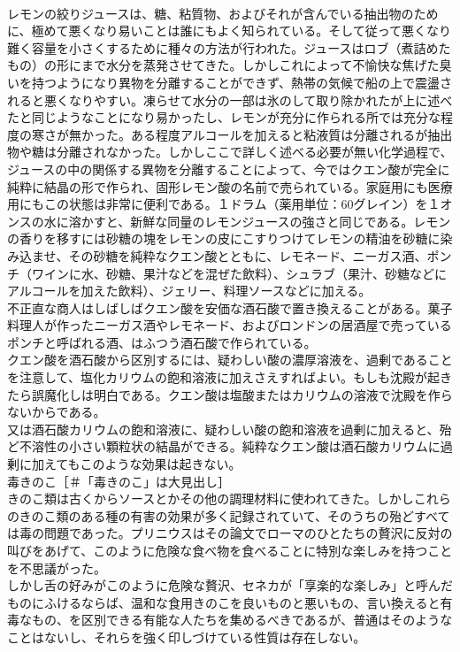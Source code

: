 \documentclass[8pt]{extreport}
\begin{document}
\begin{CJK}{UTF8}{min}
\\	レモンの絞りジュースは、糖、粘質物、およびそれが含んでいる抽出物のために、極めて悪くなり易いことは誰にもよく知られている。そして従って悪くなり難く容量を小さくするために種々の方法が行われた。ジュースはロブ（煮詰めたもの）の形にまで水分を蒸発させてきた。しかしこれによって不愉快な焦げた臭いを持つようになり異物を分離することができず、熱帯の気候で船の上で震盪されると悪くなりやすい。凍らせて水分の一部は氷のして取り除かれたが上に述べたと同じようなことになり易かったし、レモンが充分に作られる所では充分な程度の寒さが無かった。ある程度アルコールを加えると粘液質は分離されるが抽出物や糖は分離されなかった。しかしここで詳しく述べる必要が無い化学過程で、ジュースの中の関係する異物を分離することによって、今ではクエン酸が完全に純粋に結晶の形で作られ、固形レモン酸の名前で売られている。家庭用にも医療用にもこの状態は非常に便利である。１ドラム（薬用単位：60グレイン）を１オンスの水に溶かすと、新鮮な同量のレモンジュースの強さと同じである。レモンの香りを移すには砂糖の塊をレモンの皮にこすりつけてレモンの精油を砂糖に染み込ませ、その砂糖を純粋なクエン酸とともに、レモネード、ニーガス酒、ポンチ（ワインに水、砂糖、果汁などを混ぜた飲料）、シュラブ（果汁、砂糖などにアルコールを加えた飲料）、ジェリー、料理ソースなどに加える。
\\	不正直な商人はしばしばクエン酸を安価な酒石酸で置き換えることがある。菓子料理人が作ったニーガス酒やレモネード、およびロンドンの居酒屋で売っているポンチと呼ばれる酒、はふつう酒石酸で作られている。
\\	クエン酸を酒石酸から区別するには、疑わしい酸の濃厚溶液を、過剰であることを注意して、塩化カリウムの飽和溶液に加えさえすればよい。もしも沈殿が起きたら誤魔化しは明白である。クエン酸は塩酸またはカリウムの溶液で沈殿を作らないからである。
\\	又は酒石酸カリウムの飽和溶液に、疑わしい酸の飽和溶液を過剰に加えると、殆ど不溶性の小さい顆粒状の結晶ができる。純粋なクエン酸は酒石酸カリウムに過剰に加えてもこのような効果は起きない。
\\	毒きのこ［＃「毒きのこ」は大見出し］
\\	きのこ類は古くからソースとかその他の調理材料に使われてきた。しかしこれらのきのこ類のある種の有害の効果が多く記録されていて、そのうちの殆どすべては毒の問題であった。プリニウスはその論文でローマのひとたちの贅沢に反対の叫びをあげて、このように危険な食べ物を食べることに特別な楽しみを持つことを不思議がった。
\\	しかし舌の好みがこのように危険な贅沢、セネカが「享楽的な楽しみ」と呼んだものにふけるならば、温和な食用きのこを良いものと悪いもの、言い換えると有毒なもの、を区別できる有能な人たちを集めるべきであるが、普通はそのようなことはないし、それらを強く印しづけている性質は存在しない。

\end{CJK}
\end{document}
